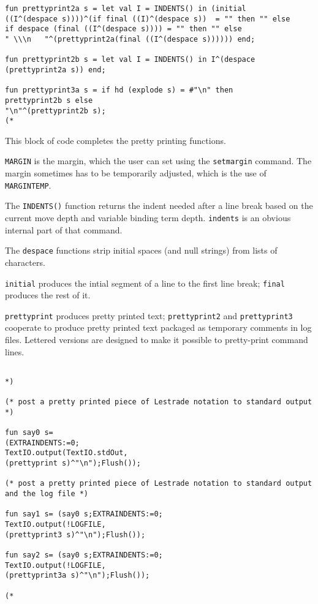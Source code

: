 \documentclass{article}
\begin{document}
\begin{verbatim}
fun prettyprint2a s = let val I = INDENTS() in (initial 
((I^(despace s))))^(if final ((I)^(despace s))  = "" then "" else
if despace (final ((I^(despace s)))) = "" then "" else
" \\\n   "^(prettyprint2a(final ((I^(despace s)))))) end;

fun prettyprint2b s = let val I = INDENTS() in I^(despace (prettyprint2a s)) end;

fun prettyprint3a s = if hd (explode s) = #"\n" then 
prettyprint2b s else
"\n"^(prettyprint2b s);
(*

\end{verbatim}

This block of code completes the pretty printing functions.

{\tt MARGIN} is the margin, which the user can set using the {\tt setmargin} command.   The margin sometimes has to be temporarily adjusted, which is the use of {\tt MARGINTEMP}.

The {\tt INDENTS()} function returns the indent needed after a line break based on the current move depth and variable binding term depth.  {\tt indents} is an obvious internal part of that command.

The {\tt despace} functions strip initial spaces (and null strings) from lists of characters. 

{\tt initial} produces the intial segment of a line to the first line break;  {\tt final} produces the rest of it.

{\tt prettyprint} produces pretty printed text;  {\tt prettyprint2} and {\tt prettyprint3} cooperate to produce pretty printed text packaged as temporary comments
in log files.  Lettered versions are designed to make it possible to pretty-print command lines.

\begin{verbatim}

*)

(* post a pretty printed piece of Lestrade notation to standard output *)

fun say0 s= 
(EXTRAINDENTS:=0;
TextIO.output(TextIO.stdOut,
(prettyprint s)^"\n");Flush());

(* post a pretty printed piece of Lestrade notation to standard output and the log file *)

fun say1 s= (say0 s;EXTRAINDENTS:=0;
TextIO.output(!LOGFILE,
(prettyprint3 s)^"\n");Flush());

fun say2 s= (say0 s;EXTRAINDENTS:=0;
TextIO.output(!LOGFILE,
(prettyprint3a s)^"\n");Flush());

(*

\end{verbatim}
\end{document}
